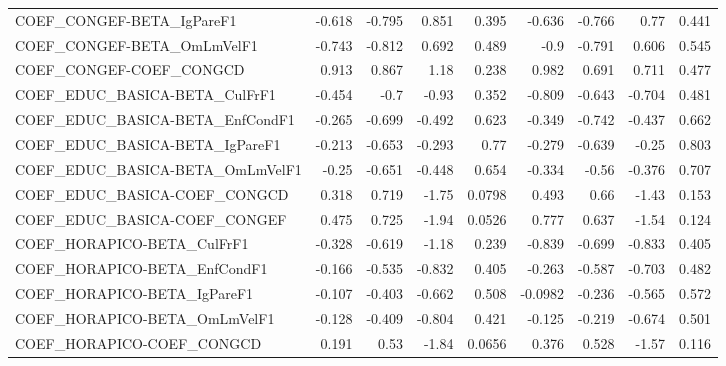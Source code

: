 \begin{tabular}{lrrrrrrrr}
COEF\_CONGEF-BETA\_IgPareF1             &      -0.618 &       -0.795 &   0.851 &    0.395 &     -0.636 &      -0.766 &         0.77 &         0.441 \\
COEF\_CONGEF-BETA\_OmLmVelF1            &      -0.743 &       -0.812 &   0.692 &    0.489 &       -0.9 &      -0.791 &        0.606 &         0.545 \\
COEF\_CONGEF-COEF\_CONGCD               &       0.913 &        0.867 &    1.18 &    0.238 &      0.982 &       0.691 &        0.711 &         0.477 \\
COEF\_EDUC\_BASICA-BETA\_CulFrF1         &      -0.454 &         -0.7 &   -0.93 &    0.352 &     -0.809 &      -0.643 &       -0.704 &         0.481 \\
COEF\_EDUC\_BASICA-BETA\_EnfCondF1       &      -0.265 &       -0.699 &  -0.492 &    0.623 &     -0.349 &      -0.742 &       -0.437 &         0.662 \\
COEF\_EDUC\_BASICA-BETA\_IgPareF1        &      -0.213 &       -0.653 &  -0.293 &     0.77 &     -0.279 &      -0.639 &        -0.25 &         0.803 \\
COEF\_EDUC\_BASICA-BETA\_OmLmVelF1       &       -0.25 &       -0.651 &  -0.448 &    0.654 &     -0.334 &       -0.56 &       -0.376 &         0.707 \\
COEF\_EDUC\_BASICA-COEF\_CONGCD          &       0.318 &        0.719 &   -1.75 &   0.0798 &      0.493 &        0.66 &        -1.43 &         0.153 \\
COEF\_EDUC\_BASICA-COEF\_CONGEF          &       0.475 &        0.725 &   -1.94 &   0.0526 &      0.777 &       0.637 &        -1.54 &         0.124 \\
COEF\_HORAPICO-BETA\_CulFrF1            &      -0.328 &       -0.619 &   -1.18 &    0.239 &     -0.839 &      -0.699 &       -0.833 &         0.405 \\
COEF\_HORAPICO-BETA\_EnfCondF1          &      -0.166 &       -0.535 &  -0.832 &    0.405 &     -0.263 &      -0.587 &       -0.703 &         0.482 \\
COEF\_HORAPICO-BETA\_IgPareF1           &      -0.107 &       -0.403 &  -0.662 &    0.508 &    -0.0982 &      -0.236 &       -0.565 &         0.572 \\
COEF\_HORAPICO-BETA\_OmLmVelF1          &      -0.128 &       -0.409 &  -0.804 &    0.421 &     -0.125 &      -0.219 &       -0.674 &         0.501 \\
COEF\_HORAPICO-COEF\_CONGCD             &       0.191 &         0.53 &   -1.84 &   0.0656 &      0.376 &       0.528 &        -1.57 &         0.116 \\

\end{tabular}
